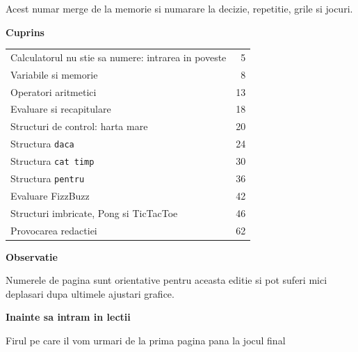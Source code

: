 \vfill
\begin{center}
\small Acest numar merge de la memorie si numarare la decizie, repetitie, grile si jocuri.
\end{center}
\clearpage

\color{black}
\thispagestyle{empty}
\begin{center}
{\Huge\bfseries Cuprins}\par
\vspace{1.4em}
\end{center}

\begin{tabularx}{\linewidth}{@{}Xr@{}}
Calculatorul nu stie sa numere: intrarea in poveste & 5 \\
Variabile si memorie & 8 \\
Operatori aritmetici & 13 \\
Evaluare si recapitulare & 18 \\
Structuri de control: harta mare & 20 \\
Structura \texttt{daca} & 24 \\
Structura \texttt{cat timp} & 30 \\
Structura \texttt{pentru} & 36 \\
Evaluare FizzBuzz & 42 \\
Structuri imbricate, Pong si TicTacToe & 46 \\
Provocarea redactiei & 62 \\
\end{tabularx}

\vspace{1.5em}

\begin{tcolorbox}[colback=white,colframe=black!55,boxrule=0.7pt,arc=1.5mm]
\small
\textbf{Observatie}

Numerele de pagina sunt orientative pentru aceasta editie si pot suferi mici deplasari dupa ultimele ajustari grafice.
\end{tcolorbox}

\clearpage

\color{black}
\thispagestyle{empty}
\begin{center}
{\Huge\bfseries Inainte sa intram in lectii}\par
\vspace{0.8em}
{\large Firul pe care il vom urmari de la prima pagina pana la jocul final}\par
\end{center}


